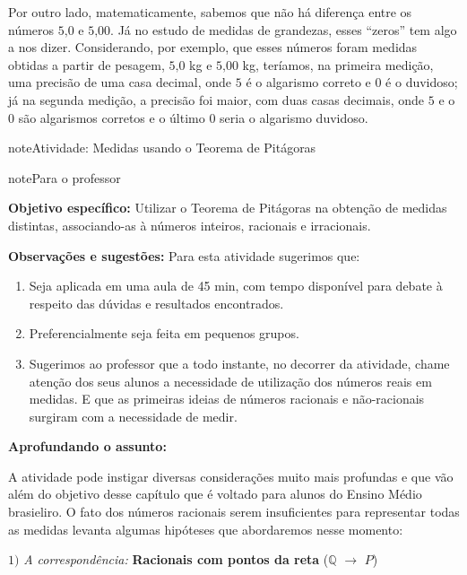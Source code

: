 Por outro lado, matematicamente, sabemos que não há diferença entre os números \(5\text{,}0\) e \(5\text{,}00\). Já no estudo de medidas de grandezas, esses “zeros” tem algo a nos dizer. Considerando, por exemplo, que esses números foram medidas obtidas a partir de pesagem, \(5\text{,}0\) kg  e \(5\text{,}00\) kg, teríamos, na primeira medição, uma precisão de uma casa decimal, onde \(5\) é o algarismo correto e \(0\) é o duvidoso; já na segunda medição, a precisão foi maior, com duas casas decimais, onde \(5\) e o \(0\) são algarismos corretos e o último \(0\) seria o algarismo duvidoso.
\label{\detokenize{NO103-5:sub-ativ-pitagoras}}
\begin{sphinxadmonition}{note}{Atividade: Medidas usando o Teorema de Pitágoras}

\begin{sphinxadmonition}{note}{Para o professor}

\textbf{Objetivo específico:} Utilizar o Teorema de Pitágoras na obtenção de medidas distintas, associando-as à números inteiros, racionais e irracionais.

\textbf{Observações e sugestões:}
Para esta atividade sugerimos que:
\begin{enumerate}
\item {} 
Seja aplicada em uma aula de 45 min, com tempo disponível para debate à respeito das dúvidas e resultados encontrados.

\item {} 
Preferencialmente seja feita em pequenos grupos.

\item {} 
Sugerimos ao professor que a todo instante, no decorrer da atividade, chame atenção dos seus alunos a necessidade de utilização dos números reais em medidas. E que as primeiras ideias de números racionais e não-racionais surgiram com a necessidade de medir.

\end{enumerate}

\textbf{Aprofundando o assunto:}

A atividade pode instigar diversas considerações muito mais profundas e que vão além do objetivo desse capítulo que é voltado para alunos do Ensino Médio brasieliro. O fato dos números racionais serem insuficientes para representar todas as medidas levanta algumas hipóteses que abordaremos nesse momento:

\(1)\) \textit{A correspondência:} \textbf{Racionais com pontos da reta} (\(\mathbb{Q}\) \(\to\) \(P\))


\end{sphinxadmonition}
\end{sphinxadmonition}
